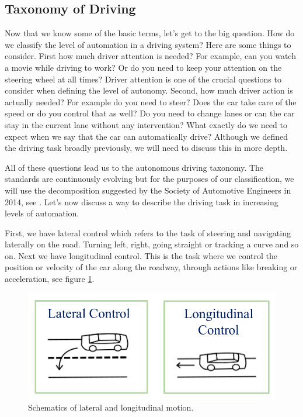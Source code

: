 \subsection{Taxonomy of Driving}
\label{driving_taxonomy}

Now that we know some of the basic terms, let's get to the big question. How do we classify the level of automation in a driving system? 
Here are some things to consider. First how much driver attention is needed? For example, can you watch a movie while driving to work? Or do you need to keep your attention on the steering wheel at all times? Driver attention is one of the crucial questions to consider when defining the level of autonomy. Second, how much driver action is actually needed? For example do you need to steer? Does the car take care of the speed or do you control that as well? Do you need to change lanes or can the car stay in the current lane without any intervention? What exactly do we need to expect when we say that the car can automatically drive? Although we defined the driving task broadly previously, we will need to discuss this in more depth. 

All of these questions lead us to the autonomous driving taxonomy. The standards are continuously evolving but for the purposes of our classification, we will use the decomposition suggested by the Society of Automotive Engineers in 2014, see \cite{SAE2014, SAE2016}. Let's now discuss a way to describe the driving task in increasing levels of automation. 

First, we have lateral control which refers to the task of steering and navigating laterally on the road. Turning left, right, going straight or tracking a curve and so on. Next we have longitudinal control. This is the task where we control the position or velocity of the car along the roadway, through actions like breaking or acceleration, see figure \ref{lateral_longitu_control}. 


\begin{figure}[!htb]
\begin{center}
\includegraphics[scale=0.280]{img/intro_self_driving/lateral_longitu_control.jpeg}
\end{center}
\caption{Schematics of lateral and longitudinal motion.}
\label{lateral_longitu_control}
\end{figure}










